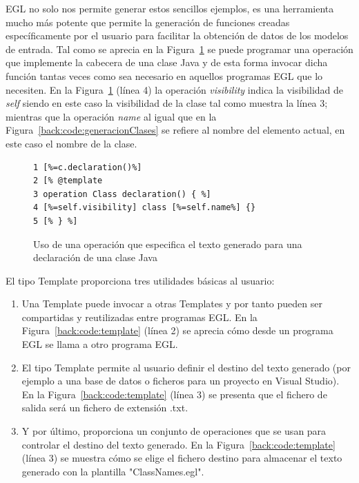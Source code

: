  EGL no solo nos permite generar estos sencillos ejemplos, es una herramienta mucho más potente que permite la generación de funciones creadas específicamente por el usuario para facilitar la obtención de datos de los modelos de entrada. Tal como se aprecia en la Figura~\ref{back:code:generacionOperacion} se puede programar una operación que implemente la cabecera de una clase Java y de esta forma invocar dicha función tantas veces como sea necesario en aquellos programas EGL que lo necesiten. En la Figura~\ref{back:code:generacionOperacion} (línea 4) la operación \emph{visibility} indica la visibilidad de \emph{self} siendo en este caso la visibilidad de la clase tal como muestra la línea 3; mientras que la operación \emph{name} al igual que en la Figura~\ref{back:code:generacionClases} se refiere al nombre del elemento actual, en este caso el nombre de la clase.

\begin{figure}[tb!]
\begin{center}
\begin{footnotesize}
\begin{verbatim}
1 [%=c.declaration()%]
2 [% @template
3 operation Class declaration() { %]
4 [%=self.visibility] class [%=self.name%] {}
5 [% } %]
\end{verbatim}
\end{footnotesize}
\end{center}
\caption{Uso de una operación que especifica el texto generado para una declaración de una clase Java}
\label{back:code:generacionOperacion}
\end{figure}

El tipo Template proporciona tres utilidades básicas al usuario:

\begin{enumerate}
	\item  Una Template puede invocar a otras Templates y por tanto pueden ser compartidas y reutilizadas entre programas EGL. En la Figura~\ref{back:code:template} (línea 2) se aprecia cómo desde un programa EGL se llama a otro programa EGL.
    \item El tipo Template permite al usuario definir el destino del texto generado (por ejemplo a una base de datos o ficheros para un proyecto en Visual Studio).  En la Figura~\ref{back:code:template} (línea 3) se presenta que el fichero de salida será un fichero de extensión .txt.
    \item Y por último, proporciona un conjunto de operaciones que se usan para controlar el destino del texto generado. En la Figura~\ref{back:code:template} (línea 3) se muestra cómo se elige el fichero destino para almacenar el texto generado con la plantilla "ClassNames.egl".
\end{enumerate}


